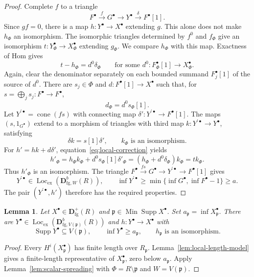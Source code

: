\documentclass[11pt]{amsart}
\numberwithin{equation}{section}
\newtheorem{lemma}[theorem]{Lemma}
\theoremstyle{definition}
\theoremstyle{remark}
\DeclareMathOperator{\Supp}{Supp}
\DeclareMathOperator{\Min}{Min}
\DeclareMathOperator{\Loc}{Loc}
\DeclareMathOperator{\cone}{cone}
\newcommand{\D}{\mathbf D}
\newcommand{\fg}{\mathrm{fg}}
\newcommand{\Lex}{\Loc_{\mathrm{ex}}}
\newcommand{\p}{\mathfrak p}
\begin{document}
\begin{proof}
Complete $f$ to a triangle
\[
 F^{\bullet}\xrightarrow{f}G^{\bullet}\longrightarrow Y^{\bullet}\xrightarrow{\delta}F^{\bullet}[1].
\]
Since $gf=0$, there is a map $h:Y^{\bullet}\to X^{\bullet}$
extending $g$. This alone does not make $h_\Phi$ an isomorphism.
The isomorphic triangles determined by $f^0$ and $f_\Phi$ give an
isomorphism $t:Y_\Phi^{\bullet}\to X_\Phi^{\bullet}$ extending $g_\Phi$.
We compare $h_\Phi$ with this map. Exactness of Hom gives
\begin{equation}\label{eq:local-correction}
 t-h_\Phi=d^0\delta_\Phi
 \qquad\text{for some }d^0:F_\Phi^{\bullet}[1]\to X_\Phi^{\bullet}.
\end{equation}
Again, clear the denominator separately on each bounded summand
$F_j^{\bullet}[1]$ of the source of $d^0$. There are $s_j\in\Phi$ and $d:F^{\bullet}[1]\to X^{\bullet}$ such that, for
$s=\bigoplus_js_j:F^{\bullet}\to F^{\bullet}$,
\[
 d_\Phi=d^0s_\Phi[1].
\]
Let $Y^{\prime\bullet}=\cone(fs)$ with connecting map $\delta':Y^{\prime\bullet}\to F^{\bullet}[1]$.
The maps $(s,1_{G^{\bullet}})$ extend to a morphism of triangles with third map
$k:Y^{\prime\bullet}\to Y^{\bullet}$, satisfying
\[
 \delta k=s[1]\delta',\qquad k_\Phi\text{ is an isomorphism}.
\]
For $h'=hk+d\delta'$, equation~\eqref{eq:local-correction} yields
\[
 h'_\Phi=h_\Phi k_\Phi+d^0s_\Phi[1]\delta'_\Phi
 =(h_\Phi+d^0\delta_\Phi)k_\Phi=tk_\Phi.
\]
Thus $h'_\Phi$ is an isomorphism. The triangle
$F^{\bullet}\xrightarrow{fs}G^{\bullet}\to Y^{\prime\bullet}\to F^{\bullet}[1]$ gives
\[
 Y^{\prime\bullet}\in\Lex(\D^b_{\fg,W}(R)),\qquad
 \inf Y^{\prime\bullet}\geq\min\{\inf G^{\bullet},\inf F^{\bullet}-1\}\geq a.
\]
The pair $(Y^{\prime\bullet},h')$ therefore has the required properties.
\end{proof}

\begin{lemma}\label{lem:spreading}
Let $X^{\bullet}\in\D^+_{\fg}(R)$ and $\p\in\Min\Supp X^{\bullet}$. Set
$a_\p=\inf X_\p^{\bullet}$. There are
$Y^{\bullet}\in\Lex(\D^b_{\fg,V(\p)}(R))$ and $h:Y^{\bullet}\to X^{\bullet}$ with
\begin{equation}\label{eq:spreading}
 \Supp Y^{\bullet}\subseteq V(\p),\qquad \inf Y^{\bullet}\geq a_\p,
 \qquad h_\p\text{ is an isomorphism}.
\end{equation}
\end{lemma}
\begin{proof}
Every $H^i(X_\p^{\bullet})$ has finite length over $R_\p$.
Lemma~\ref{lem:local-length-model} gives a finite-length representative
of $X_\p^{\bullet}$, zero below $a_\p$. Apply
Lemma~\ref{lem:scalar-spreading} with $\Phi=R\setminus\p$ and
$W=V(\p)$.
\end{proof}
\end{document}
